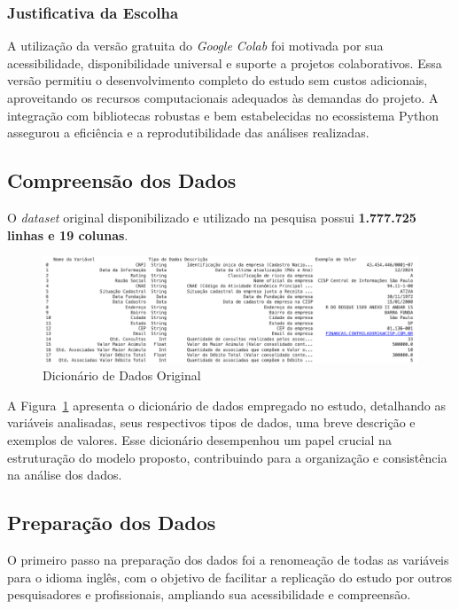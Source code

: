 \documentclass[12pt,a4paper]{article}
\begin{document}
\subsubsection{Justificativa da Escolha}
A utilização da versão gratuita do \textit{Google Colab} foi motivada por sua acessibilidade, disponibilidade universal e suporte a projetos colaborativos. Essa versão permitiu o desenvolvimento completo do estudo sem custos adicionais, aproveitando os recursos computacionais adequados às demandas do projeto. A integração com bibliotecas robustas e bem estabelecidas no ecossistema Python assegurou a eficiência e a reprodutibilidade das análises realizadas.

\subsection{Compreensão dos Dados}

O \textit{dataset} original disponibilizado e utilizado na pesquisa possui \textbf{1.777.725 linhas e 19 colunas}. 

\begin{figure}[H]
    \centering
    \includegraphics[width=\textwidth]{dicionariodedados.png}
    \caption{Dicionário de Dados Original}
    \label{fig:dicionario_dados}
\end{figure}


A Figura~\ref{fig:dicionario_dados} apresenta o dicionário de dados empregado no estudo, detalhando as variáveis analisadas, seus respectivos tipos de dados, uma breve descrição e exemplos de valores. Esse dicionário desempenhou um papel crucial na estruturação do modelo proposto, contribuindo para a organização e consistência na análise dos dados.

\subsection{Preparação dos Dados}

O primeiro passo na preparação dos dados foi a renomeação de todas as variáveis para o idioma inglês, com o objetivo de facilitar a replicação do estudo por outros pesquisadores e profissionais, ampliando sua acessibilidade e compreensão.
\end{document}
